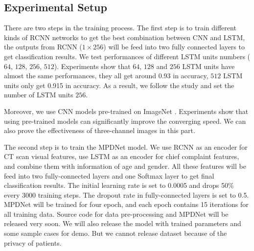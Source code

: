 \subsection{Experimental Setup}
\label{experimentalsetup}
There are two steps in the training process.
The first step is to train different kinds of RCNN networks to get the best combination between CNN and LSTM, the outputs from RCNN ($1 \times 256$) will be feed into two fully connected layers to get classification results. 
We test performances of different LSTM units numbers ($64$, $128$, $256$, $512$). Experiments show that $64$, $128$ and $256$ LSTM units have almost the same performances, they all get around 0.93 in accuracy, $512$ LSTM units only get 0.915 in accuracy. As a result, we follow the study \cite{Donahue2015Long} and set the number of LSTM units $256$.

Moreover, we use CNN models pre-trained on ImageNet \cite{ILSVRC15}. Experiments show that using pre-trained models can significantly improve the converging speed. We can also prove the effectiveness of three-channel images in this part.

The second step is to train the MPDNet model. We use RCNN as an encoder for CT scan visual features, use LSTM as an encoder for chief complaint features, and combine them with information of age and gender. All these features will be feed into two fully-connected layers and one Softmax layer to get final classification results. The initial learning rate is set to 0.0005 and drops 50\% every 3000 training steps. The dropout rate in fully-connected layers is set to 0.5. MPDNet will be trained for four epoch, and each epoch contains 15 iterations for all training data.
Source code for data pre-processing and MPDNet will be released very soon. We will also release the model with trained parameters and some sample cases for demo. But we cannot release dataset because of the privacy of patients. 


